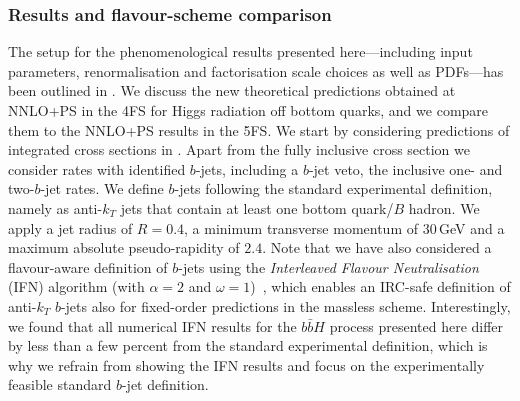 \documentclass[11pt,a4paper]{article}
\begin{document}
\subsubsection{Results and flavour-scheme comparison}
The setup for the phenomenological results presented here---including input parameters, renormalisation and factorisation scale choices as well as PDFs---has been outlined in . We discuss the new theoretical predictions obtained at NNLO+PS in the 4FS for Higgs radiation off bottom quarks, and we compare them to the NNLO+PS results
in the 5FS. We start by considering predictions of integrated cross sections in . Apart from the fully inclusive cross section we consider rates with identified $b$-jets, including a $b$-jet veto, the inclusive one- and two-$b$-jet rates. We define $b$-jets following the 
standard experimental definition, namely as anti-$k_T$ jets that 
contain at least one bottom quark/$B$ hadron. 
We apply a jet radius of $R=0.4$, a minimum transverse momentum of $30$\,GeV and a 
maximum absolute pseudo-rapidity of $2.4$. Note that we have also considered a flavour-aware definition of $b$-jets using the 
{\it Interleaved Flavour Neutralisation} (IFN) algorithm (with $\alpha = 2$ and $\omega = 1$)~\cite{Caola:2023wpj}, 
which enables an IRC-safe definition of anti-$k_T$ $b$-jets also for fixed-order predictions in the massless scheme. 
Interestingly, we found that all numerical IFN results for the $b\bar b H$ process presented here differ by less than 
a few percent from the standard experimental definition, which is why we refrain from showing the IFN results and focus 
on the experimentally feasible standard $b$-jet definition.
\end{document}
